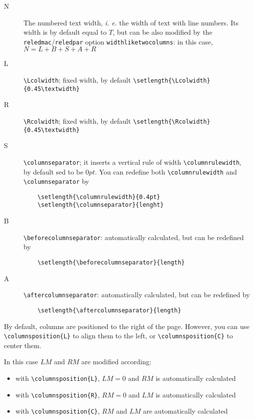 \documentclass[11pt,a4paper]{book}
\begin{document}
\begin{description}	
	\item[N] The numbered text width, \textit{i. e.} the width of text with line numbers. Its width is by default equal to $T$, but can be also modified by the \verb!reledmac!/\verb!reledpar! option \verb!widthliketwocolumns!: in this case, $N=L+B+S+A+R$
	
	\item[L] \verb!\Lcolwidth!; fixed width, by default \verb!\setlength{\Lcolwidth}{0.45\textwidth}!
	
	\item[R] \verb!\Rcolwidth!; fixed width, by default \verb!\setlength{\Rcolwidth}{0.45\textwidth}!
	
	\item[S] \verb!\columnseparator!; it inserts a vertical rule of width \verb!\columnrulewidth!, by default sed to be $0pt$. You can redefine both \verb!\columnrulewidth! and \verb!\columnseparator! by
	
\begin{verbatim}
	\setlength{\columnrulewidth}{0.4pt}
	\setlength{\columnseparator}{lenght}
\end{verbatim}
	
	\item[B] \verb!\beforecolumnseparator!: automatically calculated, but can be redefined by
	
\begin{verbatim}
	\setlength{\beforecolumnseparator}{length}
\end{verbatim}
	
	\item[A] \verb!\aftercolumnseparator!: automatically calculated, but can be redefined by

\begin{verbatim}
	\setlength{\aftercolumnseparator}{length}
\end{verbatim}

\end{description}

By default, columns are positioned to the right of the page. However, you can use
\verb!\columnsposition{L}! to align them to the left, or \verb!\columnsposition{C}! to center
them.

In this case $LM$ and $RM$ are modified according:

\begin{itemize}
	\item with \verb!\columnsposition{L}!, $LM=0$ and $RM$ is automatically calculated
	\item with \verb!\columnsposition{R}!, $RM=0$ and $LM$ is automatically calculated
	\item with \verb!\columnsposition{C}!, $RM$ and $LM$ are automatically calculated
\end{itemize}
\end{document}
